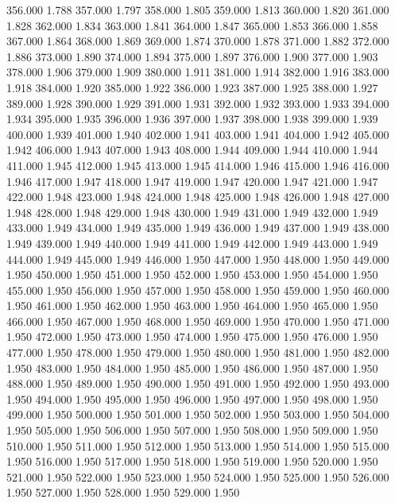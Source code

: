 356.000 1.788 
357.000 1.797 
358.000 1.805 
359.000 1.813 
360.000 1.820 
361.000 1.828 
362.000 1.834 
363.000 1.841 
364.000 1.847 
365.000 1.853 
366.000 1.858 
367.000 1.864 
368.000 1.869 
369.000 1.874 
370.000 1.878 
371.000 1.882 
372.000 1.886 
373.000 1.890 
374.000 1.894 
375.000 1.897 
376.000 1.900 
377.000 1.903 
378.000 1.906 
379.000 1.909 
380.000 1.911 
381.000 1.914 
382.000 1.916 
383.000 1.918 
384.000 1.920 
385.000 1.922 
386.000 1.923 
387.000 1.925 
388.000 1.927 
389.000 1.928 
390.000 1.929 
391.000 1.931 
392.000 1.932 
393.000 1.933 
394.000 1.934 
395.000 1.935 
396.000 1.936 
397.000 1.937 
398.000 1.938 
399.000 1.939 
400.000 1.939 
401.000 1.940 
402.000 1.941 
403.000 1.941 
404.000 1.942 
405.000 1.942 
406.000 1.943 
407.000 1.943 
408.000 1.944 
409.000 1.944 
410.000 1.944 
411.000 1.945 
412.000 1.945 
413.000 1.945 
414.000 1.946 
415.000 1.946 
416.000 1.946 
417.000 1.947 
418.000 1.947 
419.000 1.947 
420.000 1.947 
421.000 1.947 
422.000 1.948 
423.000 1.948 
424.000 1.948 
425.000 1.948 
426.000 1.948 
427.000 1.948 
428.000 1.948 
429.000 1.948 
430.000 1.949 
431.000 1.949 
432.000 1.949 
433.000 1.949 
434.000 1.949 
435.000 1.949 
436.000 1.949 
437.000 1.949 
438.000 1.949 
439.000 1.949 
440.000 1.949 
441.000 1.949 
442.000 1.949 
443.000 1.949 
444.000 1.949 
445.000 1.949 
446.000 1.950 
447.000 1.950 
448.000 1.950 
449.000 1.950 
450.000 1.950 
451.000 1.950 
452.000 1.950 
453.000 1.950 
454.000 1.950 
455.000 1.950 
456.000 1.950 
457.000 1.950 
458.000 1.950 
459.000 1.950 
460.000 1.950 
461.000 1.950 
462.000 1.950 
463.000 1.950 
464.000 1.950 
465.000 1.950 
466.000 1.950 
467.000 1.950 
468.000 1.950 
469.000 1.950 
470.000 1.950 
471.000 1.950 
472.000 1.950 
473.000 1.950 
474.000 1.950 
475.000 1.950 
476.000 1.950 
477.000 1.950 
478.000 1.950 
479.000 1.950 
480.000 1.950 
481.000 1.950 
482.000 1.950 
483.000 1.950 
484.000 1.950 
485.000 1.950 
486.000 1.950 
487.000 1.950 
488.000 1.950 
489.000 1.950 
490.000 1.950 
491.000 1.950 
492.000 1.950 
493.000 1.950 
494.000 1.950 
495.000 1.950 
496.000 1.950 
497.000 1.950 
498.000 1.950 
499.000 1.950 
500.000 1.950 
501.000 1.950 
502.000 1.950 
503.000 1.950 
504.000 1.950 
505.000 1.950 
506.000 1.950 
507.000 1.950 
508.000 1.950 
509.000 1.950 
510.000 1.950 
511.000 1.950 
512.000 1.950 
513.000 1.950 
514.000 1.950 
515.000 1.950 
516.000 1.950 
517.000 1.950 
518.000 1.950 
519.000 1.950 
520.000 1.950 
521.000 1.950 
522.000 1.950 
523.000 1.950 
524.000 1.950 
525.000 1.950 
526.000 1.950 
527.000 1.950 
528.000 1.950 
529.000 1.950 
